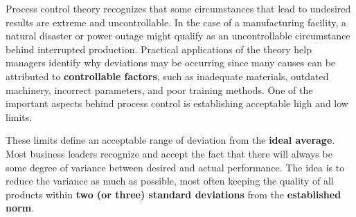 \documentclass[12pt]{article}
\begin{document}
Process control theory recognizes that some circumstances that lead to undesired results are extreme and uncontrollable. In the case of a manufacturing facility, a natural disaster or power outage might qualify as an uncontrollable circumstance behind interrupted production. Practical applications of the theory help managers identify why deviations may be occurring since many causes can be attributed to \textbf{controllable factors}, such as inadequate materials, outdated machinery, incorrect parameters, and poor training methods. One of the important aspects behind process control is establishing acceptable high and low limits.

These limits define an acceptable range of deviation from the \textbf{ideal average}. Most business leaders recognize and accept the fact that there will always be some degree of variance between desired and actual performance. The idea is to reduce the variance as much as possible, most often keeping the quality of all products within \textbf{two (or three) standard deviations} from the \textbf{established norm}.
\end{document}
